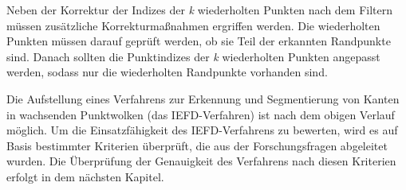Neben der Korrektur der Indizes der \textit{k} wiederholten Punkten nach dem Filtern müssen zusätzliche Korrekturmaßnahmen ergriffen werden. Die wiederholten Punkten müssen darauf geprüft werden, ob sie Teil der erkannten Randpunkte sind. Danach sollten die Punktindizes der \textit{k} wiederholten Punkten angepasst werden, sodass nur die wiederholten Randpunkte vorhanden sind. 

Die Aufstellung eines Verfahrens zur Erkennung und Segmentierung von Kanten in wachsenden Punktwolken (das IEFD-Verfahren) ist nach dem obigen Verlauf möglich. Um die Einsatzfähigkeit des IEFD-Verfahrens zu bewerten, wird es auf Basis bestimmter Kriterien überprüft, die aus der Forschungsfragen abgeleitet wurden. Die Überprüfung der Genauigkeit des Verfahrens nach diesen Kriterien erfolgt in dem nächsten Kapitel.

